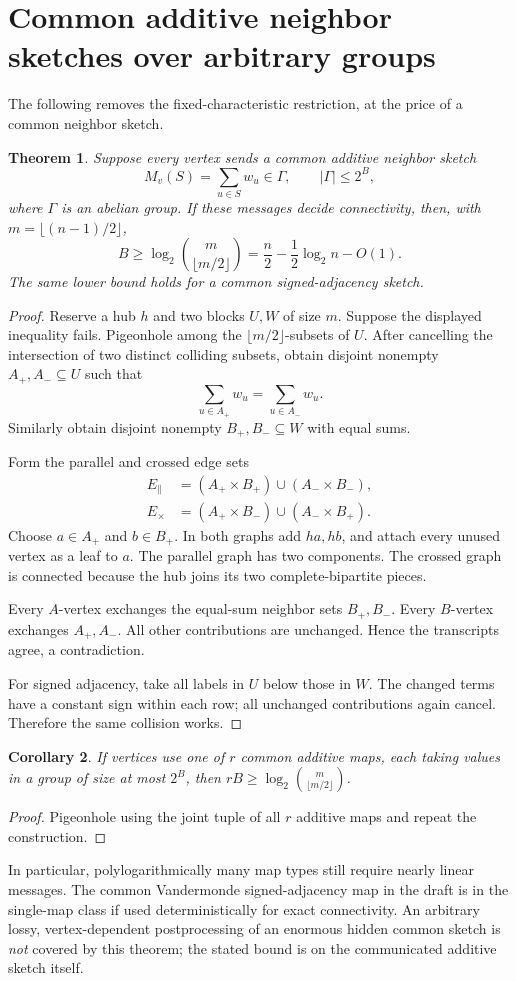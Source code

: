 \documentclass[11pt]{article}
\newtheorem{theorem}{Theorem}[section]
\newtheorem{corollary}[theorem]{Corollary}
\theoremstyle{definition}\newtheorem{definition}[theorem]{Definition}
\theoremstyle{remark}\newtheorem{remark}[theorem]{Remark}
\begin{document}
\section{Common additive neighbor sketches over arbitrary groups}
The following removes the fixed-characteristic restriction, at the price of a common neighbor sketch.

\begin{theorem}\label{thm:common}
Suppose every vertex sends a common additive neighbor sketch
\[
 M_v(S)=\sum_{u\in S}w_u\in\Gamma,
 \qquad |\Gamma|\le2^B,
\]
where $\Gamma$ is an abelian group. If these messages decide connectivity, then, with $m=\lfloor(n-1)/2\rfloor$,
\[
 B\ge\log_2\binom m{\lfloor m/2\rfloor}
 =\frac n2-\frac12\log_2 n-O(1).
\]
The same lower bound holds for a common signed-adjacency sketch.
\end{theorem}
\begin{proof}
Reserve a hub $h$ and two blocks $U,W$ of size $m$. Suppose the displayed inequality fails. Pigeonhole among the $\lfloor m/2\rfloor$-subsets of $U$. After cancelling the intersection of two distinct colliding subsets, obtain disjoint nonempty $A_+,A_-\subseteq U$ such that
\[
 \sum_{u\in A_+}w_u=\sum_{u\in A_-}w_u.
\]
Similarly obtain disjoint nonempty $B_+,B_-\subseteq W$ with equal sums.

Form the parallel and crossed edge sets
\begin{align*}
 E_\parallel&=(A_+\times B_+)\cup(A_-\times B_-),\\
 E_\times&=(A_+\times B_-)\cup(A_-\times B_+).
\end{align*}
Choose $a\in A_+$ and $b\in B_+$. In both graphs add $ha,hb$, and attach every unused vertex as a leaf to $a$. The parallel graph has two components. The crossed graph is connected because the hub joins its two complete-bipartite pieces.

Every $A$-vertex exchanges the equal-sum neighbor sets $B_+,B_-$. Every $B$-vertex exchanges $A_+,A_-$. All other contributions are unchanged. Hence the transcripts agree, a contradiction.

For signed adjacency, take all labels in $U$ below those in $W$. The changed terms have a constant sign within each row; all unchanged contributions again cancel. Therefore the same collision works.
\end{proof}

\begin{corollary}
If vertices use one of $r$ common additive maps, each taking values in a group of size at most $2^B$, then $rB\ge\log_2\binom m{\lfloor m/2\rfloor}$.
\end{corollary}
\begin{proof}
Pigeonhole using the joint tuple of all $r$ additive maps and repeat the construction.
\end{proof}
In particular, polylogarithmically many map types still require nearly linear messages. The common Vandermonde signed-adjacency map in the draft is in the single-map class if used deterministically for exact connectivity. An arbitrary lossy, vertex-dependent postprocessing of an enormous hidden common sketch is \emph{not} covered by this theorem; the stated bound is on the communicated additive sketch itself.
\end{document}
